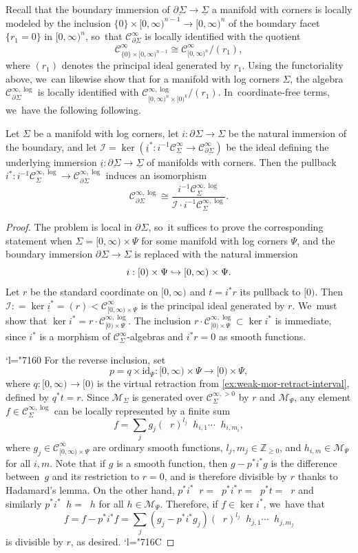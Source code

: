 \documentclass[10pt]{amsart}
\newcommand{\Changel}{\mathcode`l="7160}
\newcommand{\Changelback}{\mathcode`l="716C}
\newcommand\hto{\mathrel{\lhook\joinrel\to}}
\theoremstyle{definition}
\theoremstyle{remark}
\newcommand{\ZZ}{\mathbb{Z}}
\newcommand{\halfspc}[1]{[0,\infty)^{#1}}
\newcommand{\id}[1]{\mathrm{id}_{#1}}
\renewcommand{\ge}{\geqslant}
\newcommand{\ulog}{\mathop{\widetilde{\log}}\nolimits}
\newcommand{\defas}{\mathrel{\mathop:}=}
\newcommand{\cM}{\mathscr{M}}
\newcommand{\Cinf}[1]{\mathscr{C}^{\infty}_{#1}}
\newcommand{\Cinfpos}[1]{\mathscr{C}^{\infty, > 0}_{#1}}
\newcommand{\Cinflog}[1]{\mathscr{C}^{\infty,\log}_{#1}}
\newcommand{\Sig}{\Sigma}
\newcommand{\uSig}{\underline{\Sigma}}
\newcommand{\uPsi}{\underline{\Psi}}
\newcommand{\ubdSig}[1][]{\underline{\partial^{#1}\Sigma}}
\newcommand{\bdSig}[1][]{\partial^{#1}\Sigma}
\begin{document}
Recall that the boundary immersion of $\ubdSig \to \uSig$ a manifold with corners is locally modeled by the inclusion $\{0\} \times \halfspc{{n-1}} \to \halfspc{n}$ of the boundary facet $\{r_1=0\}$ in $\halfspc{{n}}$, so~that $\Cinf{\ubdSig}$ is locally identified with the quotient
\[
\Cinf{\{0\}\times\halfspc{n-1}}
\cong \Cinf{\halfspc{n}}/(r_1),
\]
where $(r_1)$ denotes the principal ideal generated by $r_1$. Using the functoriality above, we~can likewise show that for a manifold with log corners $\Sig$, the algebra $\Cinflog{\bdSig}$ is locally identified with $\Cinflog{\halfspc{n}\times[0)^k}/(r_1)$. In~coordinate-free terms, we~have the following following.
\begin{lemma}\label{lem:boundary-log-principal-ideal}
Let $\Sig$ be a manifold with log corners, let $i : \bdSig \to \Sig$ be the natural immersion of the boundary, and let $\mathscr{I} = \ker(\underline{i}^* : i^{-1}\Cinf{\uSig} \to \Cinf{\ubdSig})$ be the ideal defining the underlying immersion $\underline{i}: \ubdSig \to \uSig$ of manifolds with corners. Then the pullback $i^* : i^{-1}\Cinflog{\Sig} \to \Cinflog{\bdSig}$ induces an isomorphism
\[
\Cinflog{\bdSig} \cong \frac{i^{-1}\Cinflog{\Sig}}{\mathscr{I}\cdot i^{-1}\Cinflog{\Sig}}.
\]
\end{lemma}
\begin{proof}
The problem is local in $\bdSig$, so~it suffices to prove the corresponding statement when $\Sig = \halfspc{} \times \Psi$ for some manifold with log corners $\Psi$, and the boundary immersion $\bdSig \to \Sig$ is replaced with the natural immersion
\[
i : [0) \times \Psi \hto \halfspc{} \times \Psi.
\]
Let $r$ be the standard coordinate on $\halfspc{}$ and $t = i^*r$ its pullback to $[0)$. Then $\mathscr{I} \defas \ker{\underline{i}^*} = (r) < \Cinf{\halfspc{}\times \uPsi} $ is the principal ideal generated by $r$. We~must show that $\ker i^* = r \cdot \Cinflog{[0)\times\Psi}$.
The inclusion $r \cdot \Cinflog{[0)\times\Psi} \subset \ker i^*$ is immediate, since $i^*$ is a morphism of $\Cinf{\Sig}$-algebras and $i^*r = 0$ as smooth functions.

\Changel{}
For the reverse inclusion, set
\[
p = q \times \id{\Psi} : \halfspc{} \times {\Psi} \to [0) \times \Psi,
\]
where $q : \halfspc{} \to [0)$ is the virtual retraction from \autoref{ex:weak-mor-retract-interval}, defined by $q^*t = r$. Since $\cM_\Sig$ is generated over $\Cinfpos{\Sig}$ by $r$ and $\cM_{\Psi}$, any element $f \in \Cinflog{\Sig}$ can be locally represented by a finite sum
\[
f = \sum_j g_j (\ulog r)^{l_j} \ulog h_{i,1} \cdots \ulog h_{i,m_i},
\]
where $g_j \in \Cinf{\halfspc{}\times\uPsi}$ are ordinary smooth functions, $l_j,m_j \in \ZZ_{\ge 0}$, and $h_{i,m} \in \cM_{\Psi}$ for all $i,m$. Note that if $g$ is a smooth function, then $g - p^*i^*g$ is the difference between~$g$ and its restriction to $r=0$, and is therefore divisible by $r$ thanks to Hadamard's lemma. On the other hand, $p^*i^* \ulog r = \ulog p^*i^* r = \ulog p^* t = \ulog r$ and similarly $p^*i^*\ulog h = \ulog h$ for all $h \in \cM_{\Psi}$. Therefore, if $f \in \ker i^*$, we~have that
\[
f = f - p^*i^*f = \sum_j (g_j-p^*i^*g_j) (\ulog r)^{l_j} \ulog h_{j,1} \cdots \ulog h_{j,m_j}
\]
is divisible by $r$, as desired.
\Changelback
\end{proof}
\end{document}
